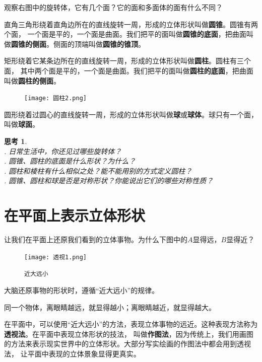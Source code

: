 \documentclass[12pt,UTF8]{ctexbook}
\newtheorem{sk}{思考}[section]
\begin{document}
观察右图中的旋转体，它有几个面？它的面和多面体的面有什么不同？

直角三角形绕着直角边所在的直线旋转一周，形成的立体形状叫做\textbf{圆锥}。圆锥有两个面，
一个面是平的，一个面是曲面。我们把平的面叫做\textbf{圆锥的底面}，把曲面叫做\textbf{圆锥的侧面}。侧面的顶端叫做\textbf{圆锥的锥顶}。

矩形绕着它某条边所在的直线旋转一周，形成的立体形状叫做\textbf{圆柱}。圆柱有三个面，
其中两个面是平的，一个面是曲面。我们把平的面叫做\textbf{圆柱的底面}，把曲面叫做\textbf{圆柱的侧面}。

\begin{figure} %
    \vspace{-16pt}
    \flushleft
    \texttt{[image: 圆柱2.png]}
\end{figure}

圆形绕着过圆心的直线旋转一周，形成的立体形状叫做\textbf{球}或\textbf{球体}。球只有一个面，叫做\textbf{球面}。

\begin{sk}
    \mbox{}\\
    . 日常生活中，你还见过哪些旋转体？\\
    . 圆锥、圆柱的底面是什么形状？为什么？\\
    . 圆柱和棱柱有什么相似之处？能不能用别的方式定义圆柱？\\
    . 圆锥、圆柱和球是否是对称形状？你能说出它们的哪些对称性质？
\end{sk}

\section{在平面上表示立体形状}

让我们在平面上还原我们看到的立体事物。为什么下图中的$A$显得远，$B$显得近？

\begin{figure}[h] %
    \centering
    \texttt{[image: 透视1.png]}
    \caption*{\texttt{近大远小}}
\end{figure}

大脑还原事物的形状时，遵循“近大远小”的规律。

同一个物体，离眼睛越远，就显得越小；离眼睛越近，就显得越大。

在平面中，可以使用“近大远小”的方法，表现立体事物的远近。这种表现方法称为\textbf{透视法}。在平面中表现立体形状的技法，
叫做\textbf{作图法}，因为传统上，我们用画图的方法来表示现实世界中的立体形状。大部分写实绘画的作图法中都会用到透视法，
让平面中表现的立体景象显得更真实。
\end{document}
